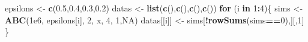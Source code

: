 \documentclass[
]{article}
\newenvironment{Shaded}{\begin{snugshade}}{\end{snugshade}}
\newcommand{\ConstantTok}[1]{\textcolor[rgb]{0.56,0.35,0.01}{#1}}
\newcommand{\ControlFlowTok}[1]{\textcolor[rgb]{0.13,0.29,0.53}{\textbf{#1}}}
\newcommand{\DecValTok}[1]{\textcolor[rgb]{0.00,0.00,0.81}{#1}}
\newcommand{\FloatTok}[1]{\textcolor[rgb]{0.00,0.00,0.81}{#1}}
\newcommand{\FunctionTok}[1]{\textcolor[rgb]{0.13,0.29,0.53}{\textbf{#1}}}
\newcommand{\NormalTok}[1]{#1}
\newcommand{\OtherTok}[1]{\textcolor[rgb]{0.56,0.35,0.01}{#1}}
\newcommand{\SpecialCharTok}[1]{\textcolor[rgb]{0.81,0.36,0.00}{\textbf{#1}}}
\begin{document}
\begin{Shaded}
\begin{Highlighting}[]
\NormalTok{epsilons }\OtherTok{\textless{}{-}} \FunctionTok{c}\NormalTok{(}\FloatTok{0.5}\NormalTok{,}\FloatTok{0.4}\NormalTok{,}\FloatTok{0.3}\NormalTok{,}\FloatTok{0.2}\NormalTok{)}
\NormalTok{datas }\OtherTok{\textless{}{-}} \FunctionTok{list}\NormalTok{(}\FunctionTok{c}\NormalTok{(),}\FunctionTok{c}\NormalTok{(),}\FunctionTok{c}\NormalTok{(),}\FunctionTok{c}\NormalTok{())}
\ControlFlowTok{for}\NormalTok{ (i }\ControlFlowTok{in} \DecValTok{1}\SpecialCharTok{:}\DecValTok{4}\NormalTok{)\{}
\NormalTok{  sims }\OtherTok{\textless{}{-}} \FunctionTok{ABC}\NormalTok{(}\FloatTok{1e6}\NormalTok{, epsilons[i], }\DecValTok{2}\NormalTok{, x, }\DecValTok{4}\NormalTok{, }\DecValTok{1}\NormalTok{,}\ConstantTok{NA}\NormalTok{)}
\NormalTok{  datas[[i]] }\OtherTok{\textless{}{-}}\NormalTok{ sims[}\SpecialCharTok{!}\FunctionTok{rowSums}\NormalTok{(sims}\SpecialCharTok{==}\DecValTok{0}\NormalTok{),][,}\DecValTok{1}\NormalTok{]}
\NormalTok{\}}


\end{Highlighting}
\end{Shaded}
\end{document}
